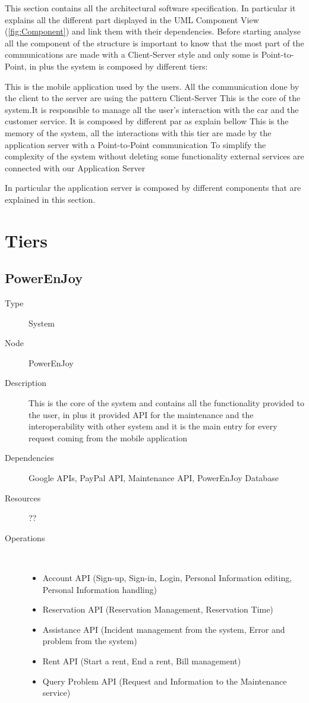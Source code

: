 This section contains all the architectural software specification. In particular it explains all the different part displayed in the UML Component View (\ref{fig:Component}) and link them with their dependencies. Before starting analyse all the component of the structure is important to know that the most part of the communications are made with a Client-Server style and only some is Point-to-Point, in plus the system is composed by different tiers:
\begin{itemize}
	 This is the mobile application used by the users. All the communication done by the client to the server are using the pattern Client-Server
	 This is the core of the system.It is responsible to manage all the user's interaction with the car and the customer service. It is composed by different par as explain bellow
	 This is the memory of the system, all the interactions with this tier are made by the application server with a Point-to-Point communication
	 To simplify the complexity of the system without deleting some functionality external services are connected with our Application Server
\end{itemize}
In particular the application server is composed by different components that are explained in this section.

\section{Tiers}
\subsection{PowerEnJoy}
\begin{description}
	\item[Type] System
	\item[Node] PowerEnJoy
	\item[Description] This is the core of the system and contains all the functionality provided to the user, in plus it provided API for the maintenance and the interoperability with other system and it is the main entry for every request coming from the mobile application
	\item[Dependencies] Google APIs, PayPal API, Maintenance API, PowerEnJoy Database
	\item[Resources] ??
	\item[Operations] \ \\
		\begin{itemize}
			\item Account API (Sign-up, Sign-in, Login, Personal Information editing, Personal Information handling)
			\item Reservation API (Reservation Management, Reservation Time)
			\item Assistance API (Incident management from the system, Error and problem from the system)
			\item Rent API (Start a rent, End a rent, Bill management)
			\item Query Problem API (Request and Information to the Maintenance service)
		\end{itemize}
\end{description}

